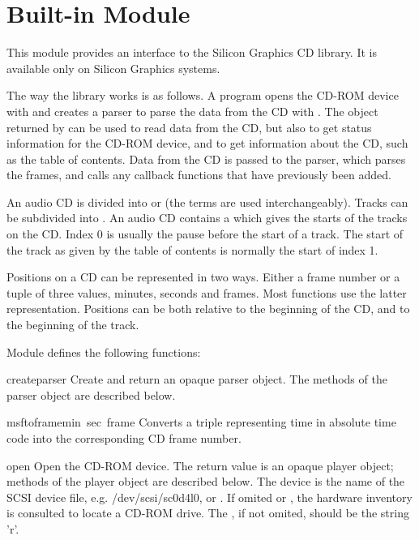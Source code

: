\section{Built-in Module }

This module provides an interface to the Silicon Graphics CD library.
It is available only on Silicon Graphics systems.

The way the library works is as follows.  A program opens the CD-ROM
device with  and creates a parser to parse the data
from the CD with .  The object returned by
 can be used to read data from the CD, but also to get
status information for the CD-ROM device, and to get information about
the CD, such as the table of contents.  Data from the CD is passed to
the parser, which parses the frames, and calls any callback
functions that have previously been added.

An audio CD is divided into  or  (the terms
are used interchangeably).  Tracks can be subdivided into
.  An audio CD contains a  which
gives the starts of the tracks on the CD.  Index 0 is usually the
pause before the start of a track.  The start of the track as given by
the table of contents is normally the start of index 1.

Positions on a CD can be represented in two ways.  Either a frame
number or a tuple of three values, minutes, seconds and frames.  Most
functions use the latter representation.  Positions can be both
relative to the beginning of the CD, and to the beginning of the
track.

Module  defines the following functions:

\renewcommand{\indexsubitem}{(in module cd)}
\begin{funcdesc}{createparser}{}
Create and return an opaque parser object.  The methods of the parser
object are described below.
\end{funcdesc}

\begin{funcdesc}{msftoframe}{min\, sec\, frame}
Converts a  triple representing time
in absolute time code into the corresponding CD frame number.
\end{funcdesc}

\begin{funcdesc}{open}{}
Open the CD-ROM device.  The return value is an opaque player object;
methods of the player object are described below.  The device is the
name of the SCSI device file, e.g. /dev/scsi/sc0d4l0, or .
If omited or , the hardware inventory is consulted to
locate a CD-ROM drive.  The , if not omited, should be the
string 'r'.
\end{funcdesc}

